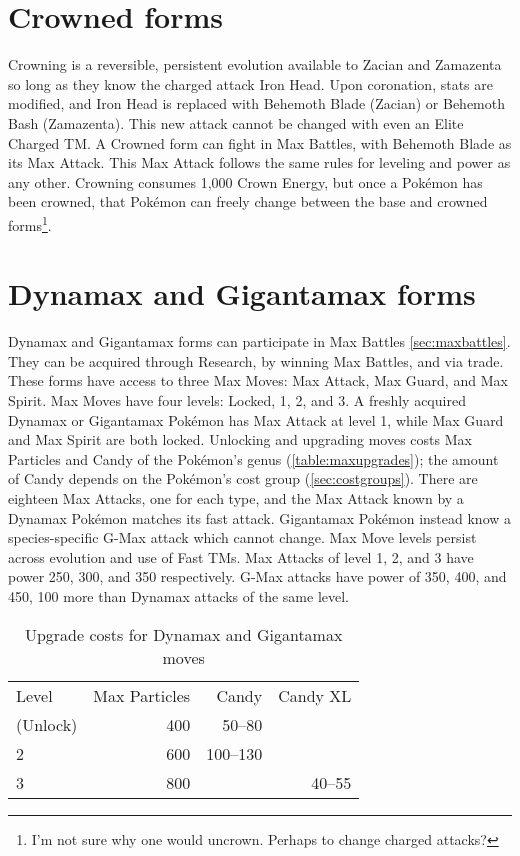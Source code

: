 \section{Crowned forms}
\label{sec:crowned}
Crowning is a reversible, persistent evolution available to Zacian and Zamazenta
 so long as they know the charged attack Iron Head.
Upon coronation, stats are modified, and Iron Head is replaced with Behemoth Blade (Zacian)
  or Behemoth Bash (Zamazenta).
This new attack cannot be changed with even an Elite Charged TM\@.
A Crowned form can fight in Max Battles, with Behemoth Blade as its Max Attack.
This Max Attack follows the same rules for leveling and power as any other.
Crowning consumes 1,000 Crown Energy, but once a Pokémon has been crowned,
  that Pokémon can freely change between the base and crowned
  forms\footnote{I'm not sure why one would uncrown. Perhaps to change charged attacks?}.


\section{Dynamax and Gigantamax forms}
\label{sec:dmaxgmax}
Dynamax and Gigantamax forms can participate in Max Battles \autoref{sec:maxbattles}.
They can be acquired through Research, by winning Max Battles, and via trade.
These forms have access to three Max Moves: Max Attack, Max Guard, and Max Spirit.
Max Moves have four levels: Locked, 1, 2, and 3.
A freshly acquired Dynamax or Gigantamax Pokémon has Max Attack at level 1, while Max Guard and Max Spirit are both locked.
Unlocking and upgrading moves costs Max Particles and Candy of the Pokémon's genus (\autoref{table:maxupgrades});
 the amount of Candy depends on the Pokémon's cost group (\autoref{sec:costgroups}).
There are eighteen Max Attacks, one for each type, and the Max Attack known by a Dynamax Pokémon matches its fast attack.
Gigantamax Pokémon instead know a species-specific G-Max attack which cannot change.
Max Move levels persist across evolution and use of Fast TMs.
Max Attacks of level 1, 2, and 3 have power 250, 300, and 350
  respectively.
G-Max attacks have power of 350, 400, and 450, 100 more than Dynamax attacks of the same level.
\begin{table}[ht]
\centering
\begin{tabular}{lrrr}
  Level & Max Particles & Candy & Candy XL\\
  \Midrule
  1 (Unlock) & 400 & 50--80 &\\
  2          & 600 & 100--130 &\\
  3          & 800 & & 40--55\\
\end{tabular}
\caption{Upgrade costs for Dynamax and Gigantamax moves}
\label{table:maxupgrades}
\end{table}



